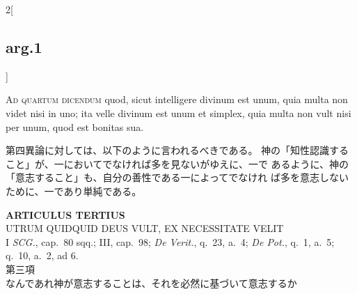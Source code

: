 \documentclass[paper=a4paper,fontsize=10pt,jafontsize=9pt,titlepage]{jlreq}
\begin{document}
\begin{paracol}{2}[\subsection{arg.1}]
\switchcolumn*[\subsection{ad.4}]


{\scshape Ad quartum dicendum} quod, sicut intelligere divinum est unum,
 quia multa non videt nisi in uno; ita velle divinum est unum et
 simplex, quia multa non vult nisi per unum, quod est bonitas sua.

\switchcolumn

第四異論に対しては、以下のように言われるべきである。
神の「知性認識すること」が、一においてでなければ多を見ないがゆえに、一で
 あるように、神の「意志すること」も、自分の善性である一によってでなけれ
 ば多を意志しないために、一であり単純である。

\end{paracol}
\newpage





{}
\setcounter{section}{3}
\setcounter{subsection}{0}
\begin{center}
 {\Large {\bfseries ARTICULUS TERTIUS}}\\
 {\large UTRUM QUIDQUID DEUS VULT, EX NECESSITATE VELIT}\\
 {\footnotesize I {\itshape SCG.}, cap.~80 sqq.; III, cap.~98; {\itshape
 De Verit.}, q.~23, a.~4; {\itshape De Pot.}, q.~1, a.~5; q.~10, a.~2,
 ad 6.}\\
 {\Large 第三項\\なんであれ神が意志することは、それを必然に基づいて意志するか}
\end{center}
\end{document}
